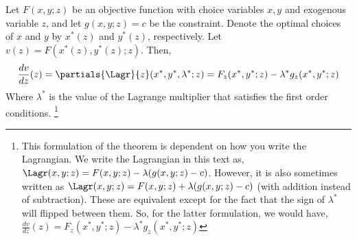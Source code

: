 \begin{theorem*} \label{thm:constrained_envelope}
    Let $F(x, y; z)$ be an objective function with choice variables $x, y$ and exogenous variable $z$, and let $g(x, y; z) = c$ be the constraint. Denote the optimal choices of $x$ and $y$ by $x^*(z)$ and $y^*(z)$, respectively. Let $v(z) = F(x^*(z), y^*(z); z)$. Then,
    \begin{align*}
        \frac{dv}{dz}(z) = \partials{\Lagr}{z}(x^*, y^*, \lambda^*; z) = F_z(x^*, y^*; z) - \lambda^* g_z(x^*, y^*; z)
    \end{align*}
    Where $\lambda^*$ is the value of the Lagrange multiplier that satisfies the first order conditions.  \footnote{This formulation of the theorem is dependent on how you write the Lagrangian. We write the Lagrangian in this text as, $\Lagr(x, y; z) = F(x, y; z) - \lambda(g(x, y; z) - c)$. However, it is also sometimes written as $\Lagr(x, y; z) = F(x, y; z) + \lambda(g(x, y; z) - c)$ (with addition instead of subtraction). These are equivalent except for the fact that the sign of $\lambda^*$ will flipped between them. So, for the latter formulation, we would have, $\frac{dv}{dz}(z) = F_z(x^*, y^*; z) - \lambda^* g_z(x^*, y^*; z)$}
\end{theorem*}

